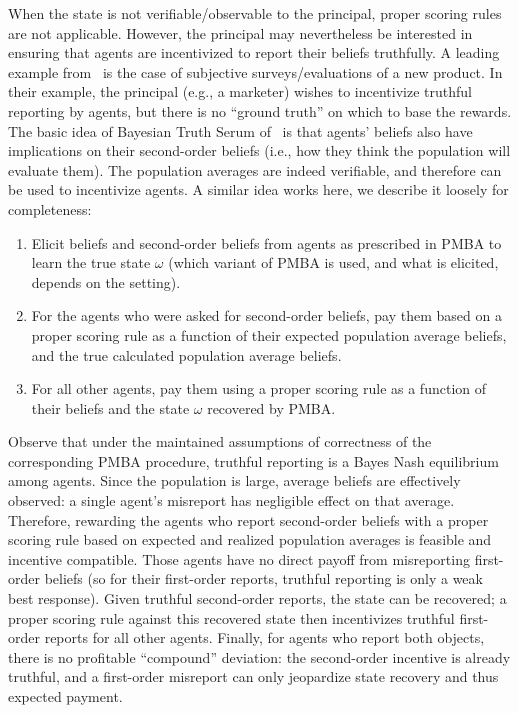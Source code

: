 \documentclass[12pt,reqno]{amsart}
\begin{document}
When the state is not verifiable/observable to the principal, proper scoring rules are not applicable. However, the principal may nevertheless be interested in ensuring that agents are incentivized to report their beliefs truthfully. A leading example from~\cite{prelec2004bayesian} is the case of subjective surveys/evaluations of a new product. In their example, the principal (e.g., a marketer) wishes to incentivize truthful reporting by agents, but there is no ``ground truth'' on which to base the rewards. The basic idea of Bayesian Truth Serum of~\cite{prelec2004bayesian} is that agents' beliefs also have implications on their second-order beliefs (i.e., how they think the population will evaluate them). The population averages are indeed verifiable, and therefore can be used to incentivize agents. A similar idea works here, we describe it loosely for completeness:
\begin{enumerate}
    \item Elicit beliefs and second-order beliefs from agents as prescribed in PMBA to learn the true state $\omega$ (which variant of PMBA is used, and what is elicited, depends on the setting). 
    \item For the agents who were asked for second-order beliefs, pay them based on a proper scoring rule as a function of their expected population average beliefs, and the true calculated population average beliefs.
    \item For all other agents, pay them using a proper scoring rule as a function of their beliefs and the state $\omega$ recovered by PMBA. 
\end{enumerate}
Observe that under the maintained assumptions of correctness of the corresponding PMBA procedure, truthful reporting is a Bayes Nash equilibrium among agents. Since the population is large, average beliefs are effectively observed: a single agent's misreport has negligible effect on that average. Therefore, rewarding the agents who report second-order beliefs with a proper scoring rule based on expected and realized population averages is feasible and incentive compatible. Those agents have no direct payoff from misreporting first-order beliefs (so for their first-order reports, truthful reporting is only a weak best response). Given truthful second-order reports, the state can be recovered; a proper scoring rule against this recovered state then incentivizes truthful first-order reports for all other agents. Finally, for agents who report both objects, there is no profitable ``compound'' deviation: the second-order incentive is already truthful, and a first-order misreport can only jeopardize state recovery and thus expected payment.
\end{document}
